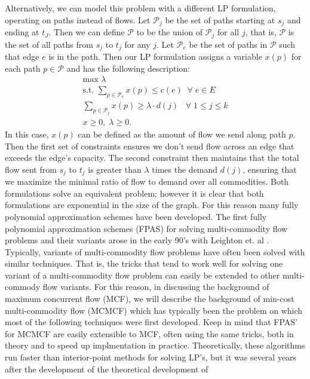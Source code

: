 Alternatively, we can model this problem with a
different LP formulation, operating on paths instead of flows. Let
$\mathcal{P}_j$ be the set of paths starting at $s_j$ and ending at
$t_J$.
Then we can define $\mathcal{P}$ to be the union of $\mathcal{P}_j$
for all $j$, that is, $\mathcal{P}$ is the set of all paths from $s_j$
to $t_j$ for any $j$. Let $\mathcal{P}_e$ be the set of paths in
$\mathcal{P}$ such that edge $e$ is in the path. Then our LP
formulation assigns a variable $x(p)$ for each path $p\in \mathcal{P}$
and has the following description:
\begin{align*}
\text{max     } \lambda \\
\text{s.t. }\sum_{p\in \mathcal{P}_e}x(p) \leq c(e) \;\;\forall\;
e\in E \\
\sum_{p\in \mathcal{P}_j} x(p)\geq \lambda\cdot d(j) \;\;\;\forall \;1\leq j\leq k \\
x\geq 0,\; \lambda\geq 0.
\end{align*}
In this case, $x(p)$ can be defined as the amount of flow we send
along path $p$. Then the first set of constraints ensures we don't
send flow across an edge that exceeds the edge's capacity. The second
constraint then maintains that the total flow sent from $s_j$ to $t_j$
is greater than $\lambda$ times the demand $d(j)$, ensuring that we
maximize the minimal ratio of flow to demand over all commodities. Both formulations solve an equivalent problem; however
it is clear that both formulations are exponential in the size of the graph. For this
reason many fully polynomial approximation schemes have been
developed. 
The first fully polynomial approximation schemes (FPAS) for solving
multi-commodity flow problems and their variants arose in the early
90's with Leighton et. al \cite{leighton}.
Typically, variants of multi-commodity flow problems have often been
solved with similar techniques. That is, the tricks that tend to work
well for solving one variant of a multi-commodity flow problem can
easily be extended to other multi-commody flow variants. For this
reason, in discussing the background of maximum concurrent flow (MCF),
we will describe the background of min-cost multi-commodity flow
(MCMCF) which has typically been the problem on which most of the
following techniques were first developed. Keep in mind that FPAS'
for MCMCF are easily extensible to MCF, often using the same tricks,
both in theory and to speed up implmentation in
practice.
Theoretically, these algorithms run faster than
interior-point methods for solving LP's, but it was several years
after the development of the theoretical development of

